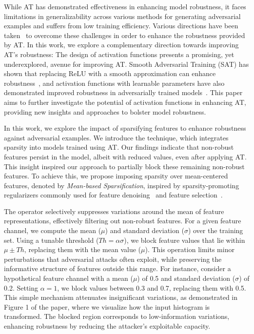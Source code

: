 \documentclass[conference]{IEEEtran}
\begin{document}
While AT has demonstrated effectiveness in enhancing model robustness, it faces limitations in generalizability across various methods for generating adversarial examples and suffers from low training efficiency. Various directions have been taken~\cite{wdaxs22, irugr21, fibwr19} to overcome these challenges in order to enhance the robustness provided by AT. In this work, we explore a complementary direction towards improving AT's robustness: The design of activation functions presents a promising, yet underexplored, avenue for improving AT. Smooth Adversarial Training (SAT) has shown that replacing ReLU with a smooth approximation can enhance robustness~\cite{satxt20}, and activation functions with learnable parameters have also demonstrated improved robustness in adversarially trained models~\cite{pafdm22, lafsl23}. This paper aims to further investigate the potential of activation functions in enhancing AT, providing new insights and approaches to bolster model robustness.

In this work, we explore the impact of sparsifying features to enhance robustness against adversarial examples. We introduce the \sys technique, which integrates sparsity into models trained using AT. Our findings indicate that non-robust features persist in the model, albeit with reduced values, even after applying AT. This insight inspired our approach to partially block these remaining non-robust features. To achieve this, we propose imposing sparsity over mean-centered features, denoted by \emph{Mean-based Sparsification}, inspired by sparsity-promoting regularizers commonly used for feature denoising~\cite{idvea06, ksaae06} and feature selection~\cite{rsat96, nfamj10}.

The \sys operator selectively suppresses variations around the mean of feature representations, effectively filtering out non-robust features. For a given feature channel, we compute the mean ($\mu$) and standard deviation ($\sigma$) over the training set. Using a tunable threshold ($ Th=\alpha \sigma$), we block feature values that lie within $\mu \pm Th$, replacing them with the mean value ($\mu$). This operation limits minor perturbations that adversarial attacks often exploit, while preserving the informative structure of features outside this range. For instance, consider a hypothetical feature channel with a mean ($\mu$) of 0.5 and standard deviation ($\sigma$) of 0.2. Setting $\alpha=1$, we block values between 0.3 and 0.7, replacing them with 0.5. This simple mechanism attenuates insignificant variations, as demonstrated in Figure 1 of the paper, where we visualize how the input histogram is transformed. The blocked region corresponds to low-information variations, enhancing robustness by reducing the attacker's exploitable capacity.
\end{document}
